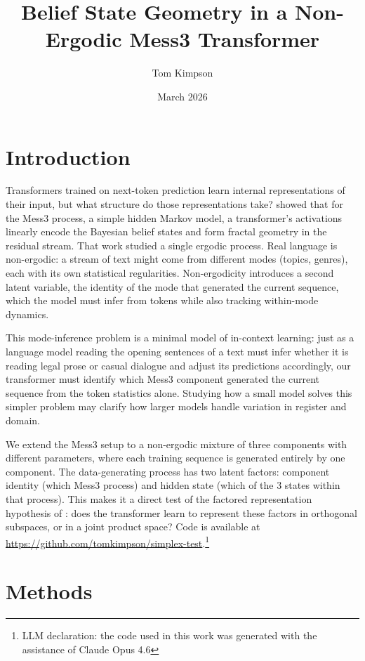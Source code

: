 \documentclass{article}
\title{Belief State Geometry in a Non-Ergodic Mess3 Transformer}
\date{March 2026}
\author{Tom Kimpson}
\begin{document}
\maketitle


\section{Introduction}

Transformers trained on next-token prediction learn internal representations of their input, but what structure do those representations take? \citet{shai2024} showed that for the Mess3 process, a simple hidden Markov model, a transformer's activations linearly encode the Bayesian belief states and form fractal geometry in the residual stream. That work studied a single ergodic process. Real language is non-ergodic: a stream of text might come from different modes (topics, genres), each with its own statistical regularities. Non-ergodicity introduces a second latent variable, the identity of the mode that generated the current sequence, which the model must infer from tokens while also tracking within-mode dynamics.

This mode-inference problem is a minimal model of in-context learning: just as a language model reading the opening sentences of a text must infer whether it is reading legal prose or casual dialogue and adjust its predictions accordingly, our transformer must identify which Mess3 component generated the current sequence from the token statistics alone. Studying how a small model solves this simpler problem may clarify how larger models handle variation in register and domain.

We extend the Mess3 setup to a non-ergodic mixture of three components with different parameters, where each training sequence is generated entirely by one component. The data-generating process has two latent factors: component identity (which Mess3 process) and hidden state (which of the 3 states within that process). This makes it a direct test of the factored representation hypothesis of \citet{shai2026}: does the transformer learn to represent these factors in orthogonal subspaces, or in a joint product space? Code is available at \url{https://github.com/tomkimpson/simplex-test}.\footnote{LLM declaration: the code used in this work was generated with the assistance of Claude Opus 4.6}


\section{Methods}
\end{document}
